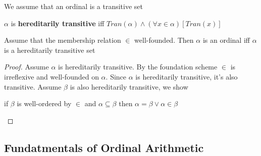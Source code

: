 \documentclass[11pt]{article}
\begin{document}
We assume that an ordinal is a transitive set

\(\alpha\) is \textbf{hereditarily transitive} iff \(Tran(\alpha)\wedge(\forall x\in\alpha)[Tran(x)]\)

\begin{lemma}[]
Assume that the membership relation \(\in\) well-founded. Then \(\alpha\) is an ordinal iff \(\alpha\) is a
hereditarily transitive set
\end{lemma}

\begin{proof}
Assume \(\alpha\) is hereditarily transitive. By the foundation scheme \(\in\) is irreflexive and
well-founded on \(\alpha\). Since \(\alpha\) is hereditarily transitive, it's also transitive. Assume \(\beta\) is also
hereditarily transitive, we show

\begin{quoting}
if \(\beta\) is well-ordered by \(\in\) and \(\alpha\subseteq\beta\) then \(\alpha=\beta\vee\alpha\in\beta\)
\end{quoting}
\end{proof}
\subsection{Fundatmentals of Ordinal Arithmetic}
\label{sec:orgc3a413b}
\end{document}

